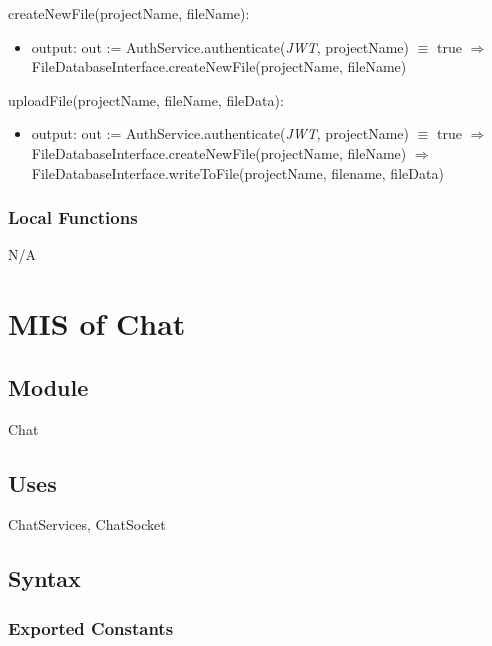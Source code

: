 \documentclass[12pt, titlepage]{article}
\begin{document}
	\noindent createNewFile(projectName, fileName):
	\begin{itemize}
		
		\item output: out :=
		AuthService.authenticate(\textit{JWT}, projectName) $\equiv$ true $\Rightarrow$ \\ FileDatabaseInterface.createNewFile(projectName, fileName)
		
	\end{itemize}
	
	\noindent uploadFile(projectName, fileName, fileData):
	\begin{itemize}
		
		\item output: out :=
		AuthService.authenticate(\textit{JWT}, projectName) $\equiv$ true $\Rightarrow$ \\
		FileDatabaseInterface.createNewFile(projectName, fileName) $\Rightarrow$ \\ FileDatabaseInterface.writeToFile(projectName, filename, fileData)
		
	\end{itemize}
	
	\subsubsection{Local Functions}
	
	N/A
	
	\newpage
	
	\section{MIS of Chat} \label{Module}
	
	\subsection{Module}
	
	Chat
	
	\subsection{Uses}
	
	ChatServices, ChatSocket
	
	\subsection{Syntax}
	
	\subsubsection{Exported Constants}
	
\end{document}
